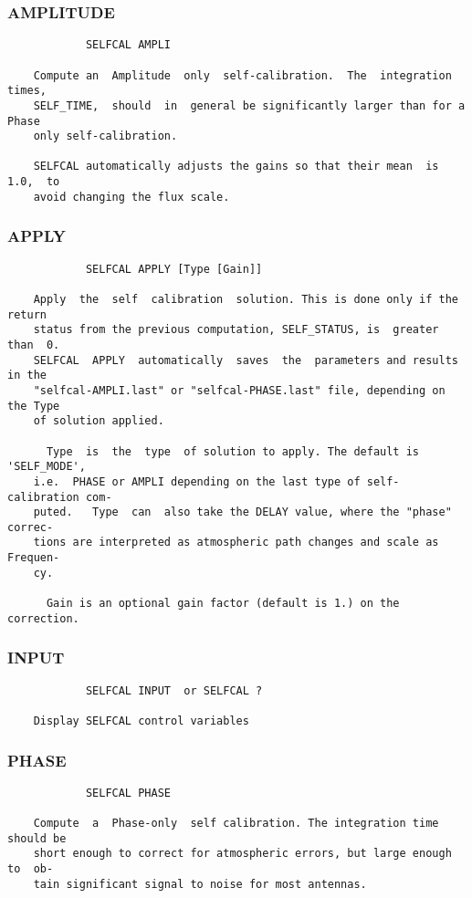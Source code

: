 \subsubsection{AMPLITUDE}
\begin{verbatim}
            SELFCAL AMPLI

    Compute an  Amplitude  only  self-calibration.  The  integration  times,
    SELF_TIME,  should  in  general be significantly larger than for a Phase
    only self-calibration.

    SELFCAL automatically adjusts the gains so that their mean  is  1.0,  to
    avoid changing the flux scale.

\end{verbatim}
\subsubsection{APPLY}
\begin{verbatim}
            SELFCAL APPLY [Type [Gain]]

    Apply  the  self  calibration  solution. This is done only if the return
    status from the previous computation, SELF_STATUS, is  greater  than  0.
    SELFCAL  APPLY  automatically  saves  the  parameters and results in the
    "selfcal-AMPLI.last" or "selfcal-PHASE.last" file, depending on the Type
    of solution applied.

      Type  is  the  type  of solution to apply. The default is 'SELF_MODE',
    i.e.  PHASE or AMPLI depending on the last type of self-calibration com-
    puted.   Type  can  also take the DELAY value, where the "phase" correc-
    tions are interpreted as atmospheric path changes and scale as  Frequen-
    cy.

      Gain is an optional gain factor (default is 1.) on the correction.

\end{verbatim}
\subsubsection{INPUT}
\begin{verbatim}
            SELFCAL INPUT  or SELFCAL ?

    Display SELFCAL control variables

\end{verbatim}
\subsubsection{PHASE}
\begin{verbatim}
            SELFCAL PHASE

    Compute  a  Phase-only  self calibration. The integration time should be
    short enough to correct for atmospheric errors, but large enough to  ob-
    tain significant signal to noise for most antennas.

\end{verbatim}
